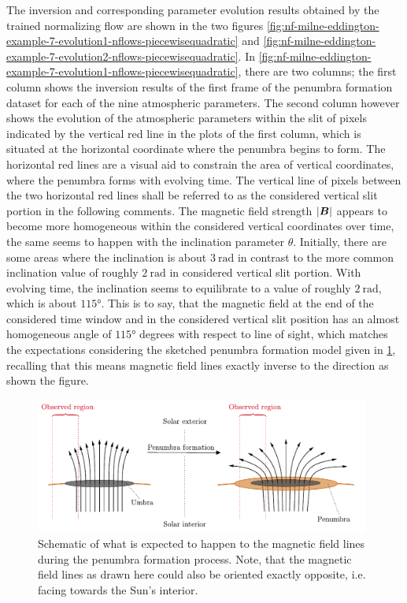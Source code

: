 \documentclass[a4paper,12pt]{report}
\begin{document}
The inversion and corresponding parameter evolution results obtained by the trained normalizing flow are shown in the two figures \cref{fig:nf-milne-eddington-example-7-evolution1-nflows-piecewisequadratic} and \cref{fig:nf-milne-eddington-example-7-evolution2-nflows-piecewisequadratic}. In \cref{fig:nf-milne-eddington-example-7-evolution1-nflows-piecewisequadratic}, there are two columns; the first column shows the inversion results of the first frame of the penumbra formation dataset for each of the nine atmospheric parameters. The second column however shows the evolution of the atmospheric parameters within the slit of pixels indicated by the vertical red line in the plots of the first column, which is situated at the horizontal coordinate where the penumbra begins to form. The horizontal red lines are a visual aid to constrain the area of vertical coordinates, where the penumbra forms with evolving time. The vertical line of pixels between the two horizontal red lines shall be referred to as the considered vertical slit portion in the following comments. The magnetic field strength $|\bm{B}|$ appears to become more homogeneous within the considered vertical coordinates over time, the same seems to happen with the inclination parameter $\theta$. Initially, there are some areas where the inclination is about $\SI{3}{\radian}$ in contrast to the more common inclination value of roughly $\SI{2}{\radian}$ in considered vertical slit portion. With evolving time, the inclination seems to equilibrate to a value of roughly $\SI{2}{\radian}$, which is about $\ang{115}$. This is to say, that the magnetic field at the end of the considered time window and in the considered vertical slit position has an almost homogeneous angle of $\ang{115}$ degrees with respect to line of sight, which matches the expectations considering the sketched penumbra formation model given in \cref{fig:penumbraformation}, recalling that this means magnetic field lines exactly inverse to the direction as shown the figure.
\begin{figure}[h]
\centering
\includegraphics[width=11cm]{figures/penumbraformation.pdf}
\caption{Schematic of what is expected to happen to the magnetic field lines during the penumbra formation process. Note, that the magnetic field lines as drawn here could also be oriented exactly opposite, i.e. facing towards the Sun's interior.}
\label{fig:penumbraformation}
\end{figure}
\end{document}
